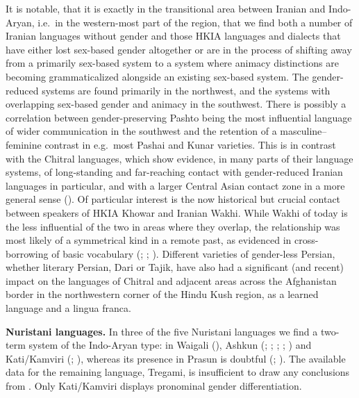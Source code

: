 \documentclass[output=collectionpaper]{langsci/langscibook}
\begin{document}
It is notable, that it is exactly in the transitional area between Iranian and Indo-Aryan, i.e.\ in the western-most part of the region, that we find both a number of Iranian languages without gender and those HKIA languages and dialects that have either lost sex-based gender altogether or are in the process of shifting away from a primarily sex-based system to a system where animacy distinctions are becoming grammaticalized alongside an existing sex-based system. The gender-reduced systems are found primarily in the northwest, and the systems with overlapping sex-based gender and animacy in the southwest. There is possibly a correlation between gender-preserving Pashto being the most influential language of wider communication in the southwest and the retention of a masculine--feminine contrast in e.g.\ most Pashai and Kunar varieties. This is in contrast with the Chitral languages, which show evidence, in many parts of their language systems, of long-standing and far-reaching contact with gender-reduced Iranian languages in particular, and with a larger Central Asian contact zone in a more general sense (\citealt[176--177]{Bashir1996}). Of particular interest is the now historical but crucial contact between speakers of HKIA Khowar and Iranian Wakhi. While Wakhi of today is the less influential of the two in areas where they overlap, the relationship was most likely of a symmetrical kind in a remote past, as evidenced in cross-borrowing of basic vocabulary (\citealt{Morgenstierne1936}; \citealt[441--442]{Morgenstierne1938}; \citealt[208--210]{Bashir2007}). Different varieties of gender-less Persian, whether literary Persian, Dari or Tajik, have also had a significant (and recent) impact on the languages of Chitral and adjacent areas across the Afghanistan border in the northwestern corner of the Hindu Kush region, as a learned language and a lingua franca.

\textbf{Nuristani languages.} In three of the five Nuristani languages we find a two-term system of the Indo-Aryan type: in Waigali (\citealt[39--91]{Degener1998}), Ashkun (\citealt{Morgenstierne1929}; \citealt{Morgenstierne1934b}; \citealt{Morgenstierne1952}; \citealt{Buddruss2006}; \citealt{Grjunberg1999}) and Kati/Kamviri (\citealt{Strand2015}; \citealt[59--71]{Edelman1983}), whereas its presence in Prasun is doubtful (\citealt{Morgenstierne1949}; \citealt[69]{Buddruss2017}). The available data for the remaining language, Tregami, is insufficient to draw any conclusions from \citep{Morgenstierne1952}. Only Kati/Kamviri displays pronominal gender differentiation.
\end{document}
